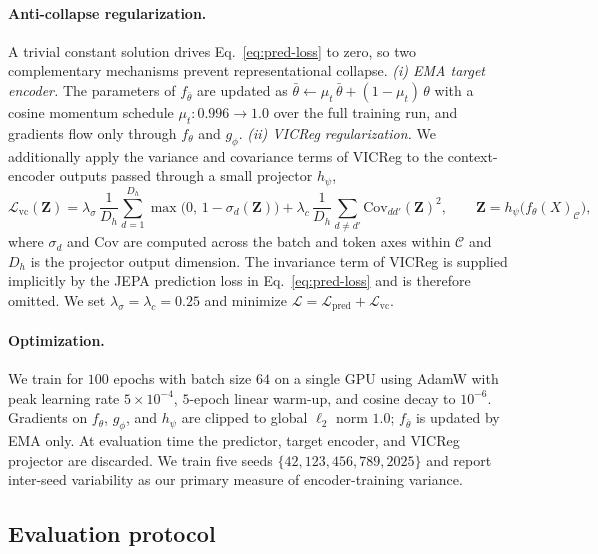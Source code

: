\paragraph{Anti-collapse regularization.}
A trivial constant solution drives Eq.~\eqref{eq:pred-loss} to zero,
so two complementary mechanisms prevent representational collapse.
\emph{(i) EMA target encoder.} The parameters of $f_{\bar\theta}$ are
updated as $\bar\theta \leftarrow \mu_t \, \bar\theta + (1 - \mu_t)\,
\theta$ with a cosine momentum schedule $\mu_t : 0.996 \to 1.0$ over
the full training run, and gradients flow only through $f_\theta$ and
$g_\phi$. \emph{(ii) VICReg regularization.} We additionally apply
the variance and covariance terms of VICReg \citep{bardes2022vicreg}
to the context-encoder outputs passed through a small projector
$h_\psi$,
\begin{equation}
  \mathcal{L}_{\text{vc}}(\mathbf{Z})
   = \lambda_{\sigma}\, \frac{1}{D_h}\sum_{d=1}^{D_h}
     \max\!\big(0,\, 1 - \sigma_d(\mathbf{Z})\big)
   + \lambda_{c}\, \frac{1}{D_h}\sum_{d \neq d'}
     \mathrm{Cov}_{d d'}(\mathbf{Z})^2,
   \qquad
   \mathbf{Z} = h_\psi\!\big(f_\theta(X)_{\mathcal{C}}\big),
\end{equation}
where $\sigma_d$ and $\mathrm{Cov}$ are computed across the batch and
token axes within $\mathcal{C}$ and $D_h$ is the projector output
dimension. The invariance term of VICReg is supplied implicitly by
the JEPA prediction loss in Eq.~\eqref{eq:pred-loss} and is therefore
omitted. We set $\lambda_\sigma = \lambda_c = 0.25$ and minimize
$\mathcal{L} = \mathcal{L}_{\text{pred}} + \mathcal{L}_{\text{vc}}$.

\paragraph{Optimization.}
We train for $100$ epochs with batch size $64$ on a single GPU using
AdamW \citep{loshchilov2019adamw} with peak learning rate
$5 \times 10^{-4}$, $5$-epoch linear warm-up, and cosine decay to
$10^{-6}$. Gradients on $f_\theta$, $g_\phi$, and $h_\psi$ are
clipped to global $\ell_2$ norm $1.0$; $f_{\bar\theta}$ is updated by
EMA only. At evaluation time the predictor, target encoder, and
VICReg projector are discarded. We train five seeds
$\{42, 123, 456, 789, 2025\}$ and report inter-seed variability as
our primary measure of encoder-training variance.

\subsection{Evaluation protocol}
\label{sec:method:eval}

